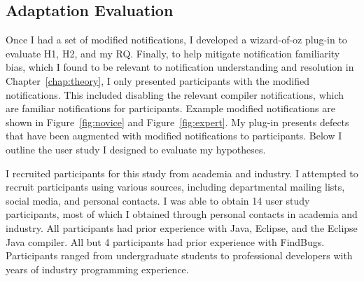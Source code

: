 \subsection{Adaptation Evaluation}

Once I had a set of modified notifications, I developed a wizard-of-oz plug-in to evaluate H1, H2, and my RQ. 
Finally, to help mitigate notification familiarity bias, which I found to be relevant to notification understanding and resolution in Chapter~\ref{chap:theory}, I only presented participants with the modified notifications. This included disabling the relevant compiler notifications, which are familiar notifications for participants. 
Example modified notifications are shown in Figure~\ref{fig:novice} and Figure~\ref{fig:expert}.
My plug-in presents defects that have been augmented with modified notifications to participants. Below I outline the user study I designed to evaluate my hypotheses.
%


I recruited participants for this study from academia and industry. 
I attempted to recruit participants using various sources, including departmental mailing lists, social media, and personal contacts.
I was able to obtain 14 user study participants, most of which I obtained through personal contacts in academia and industry.
All participants had prior experience with Java, Eclipse, and the Eclipse Java compiler. All but 4 participants had prior experience with FindBugs. 
Participants ranged from undergraduate students to professional developers with years of industry programming experience.

